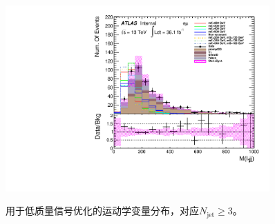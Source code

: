 \begin{figure}[h]
\begin{minipage}[t]{0.33\linewidth}
 \end{minipage}
 \begin{minipage}[t]{0.33\linewidth}
 \centering
 \includegraphics[width=0.9\textwidth,angle=-90]{fig/dataMC_high_Njet_CR/m_l1jj_emu.pdf}\label{fig:dataMC_high_Njet_CR:m_l1jj_emu.pdf}
 \end{minipage}
 \caption{用于低质量信号优化的运动学变量分布，对应$N_{\text{jet}}\geq3$。}
\label{fig:SigOpt_high_kine}
\end{figure}
